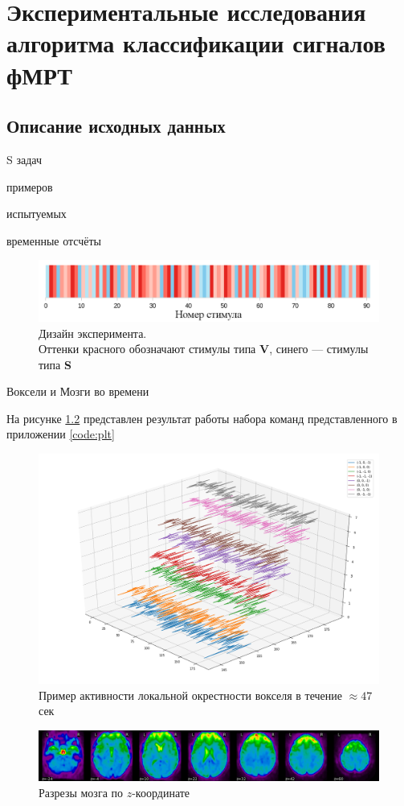 \chapter{Экспериментальные исследования алгоритма классификации сигналов фМРТ}

\section{Описание исходных данных}

S
 задач

 примеров

 испытуемых

 временные отсчёты

\begin{figure}%
	\begin{center}
		\includegraphics[width=.8\columnwidth]{./img/exp_design.png}%
	\end{center}
	\caption{Дизайн эксперимента.\\
		 Оттенки красного обозначают стимулы типа \textbf{V}, синего --- стимулы типа \textbf{S} }%
	\label{pic:exp_dis}%
\end{figure}

Воксели и Мозги во времени

На рисунке \ref{pic:local_100c} представлен результат работы набора команд представленного в приложении \ref{code:plt}
\begin{figure}%
	\begin{center}
		\includegraphics[width=.4\columnwidth]{./img/local_100c.png}%
	\end{center}
	\caption{Пример активности локальной окрестности вокселя в течение $\approx47$ сек}%
	\label{pic:local_100c}%
\end{figure}

\begin{figure}%
	\begin{center}
		\includegraphics[width=.9\columnwidth]{./img/slices.png}%
	\end{center}
	\caption{Разрезы мозга по $z$-координате}%
	\label{pic:slices}%
\end{figure}

